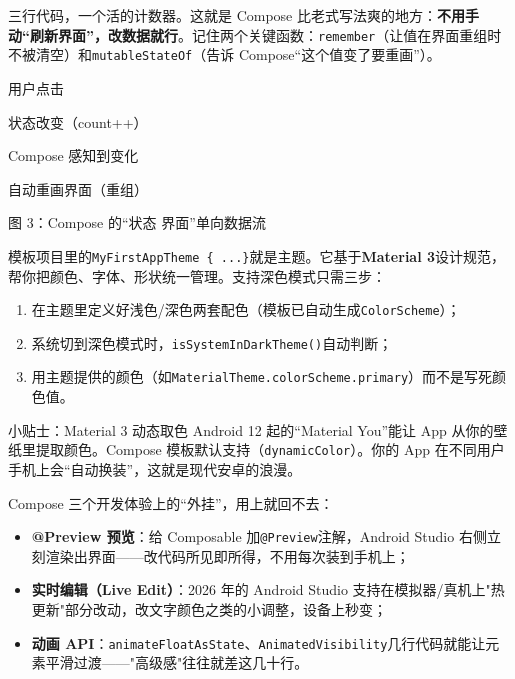 三行代码，一个活的计数器。这就是 Compose 比老式写法爽的地方：\textbf{不用手动“刷新界面”，改数据就行}。记住两个关键函数：\texttt{remember}（让值在界面重组时不被清空）和\texttt{mutableStateOf}（告诉 Compose“这个值变了要重画”）。

用户点击

状态改变（count++）

Compose 感知到变化

自动重画界面（重组）

\begin{center}\small\color{gray}图 3：Compose 的“状态 界面”单向数据流\end{center}


模板项目里的\texttt{MyFirstAppTheme \{ .\allowbreak .\allowbreak .\allowbreak  \}}就是主题。它基于\textbf{Material 3}设计规范，帮你把颜色、字体、形状统一管理。支持深色模式只需三步：

\begin{enumerate}
  \item 在主题里定义好浅色/深色两套配色（模板已自动生成\texttt{ColorScheme}）；
  \item 系统切到深色模式时，\texttt{isSystemInDarkTheme()}自动判断；
  \item 用主题提供的颜色（如\texttt{MaterialTheme.\allowbreak colorScheme.\allowbreak primary}）而不是写死颜色值。
\end{enumerate}

\begin{tcbinfo}{小贴士：Material 3 动态取色}
Android 12 起的“Material You”能让 App 从你的壁纸里提取颜色。Compose 模板默认支持（\texttt{dynamicColor}）。你的 App 在不同用户手机上会“自动换装”，这就是现代安卓的浪漫。

\end{tcbinfo}


Compose 三个开发体验上的“外挂”，用上就回不去：

\begin{itemize}
  \item \textbf{@Preview 预览}：给 Composable 加\texttt{@Preview}注解，Android Studio 右侧立刻渲染出界面——改代码所见即所得，不用每次装到手机上；
  \item \textbf{实时编辑（Live Edit）}：2026 年的 Android Studio 支持在模拟器/真机上"热更新"部分改动，改文字颜色之类的小调整，设备上秒变；
  \item \textbf{动画 API}：\texttt{animateFloatAsState}、\texttt{AnimatedVisibility}几行代码就能让元素平滑过渡——"高级感"往往就差这几十行。
\end{itemize}

